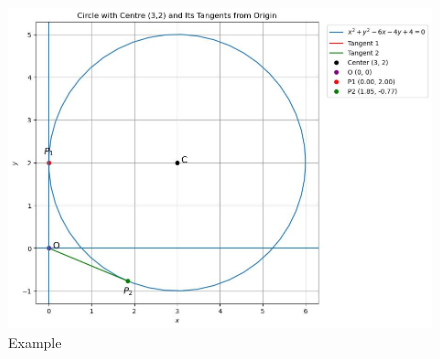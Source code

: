 \documentclass[journal]{IEEEtran}
\begin{document}
\begin{figure}[h!]
	\centering
	\includegraphics[width=0.9\columnwidth]{figs/plot_c.jpg}
	\caption*{Example}
	\label{fig:example}
\end{figure}
\end{document}
